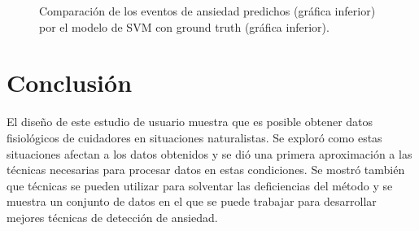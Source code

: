\begin{figure}[h!]
        \centering
        \caption{Comparaci\'on de los eventos de ansiedad predichos (gr\'afica inferior) por el modelo de SVM con ground truth (gr\'afica inferior).}\label{fig:gtvspredict}

\end{figure}

\section{Conclusi\'on}
	El dise\~no de este estudio de usuario muestra que es posible obtener datos fisiol\'ogicos de cuidadores en situaciones naturalistas. Se explor\'o como estas situaciones afectan a los datos obtenidos y se di\'o una primera aproximaci\'on a las t\'ecnicas necesarias para procesar datos en estas condiciones. Se mostr\'o tambi\'en que t\'ecnicas se pueden utilizar para solventar las deficiencias del m\'etodo y se muestra un conjunto de datos en el que se puede trabajar para desarrollar mejores t\'ecnicas de detecci\'on de ansiedad.
\newpage
